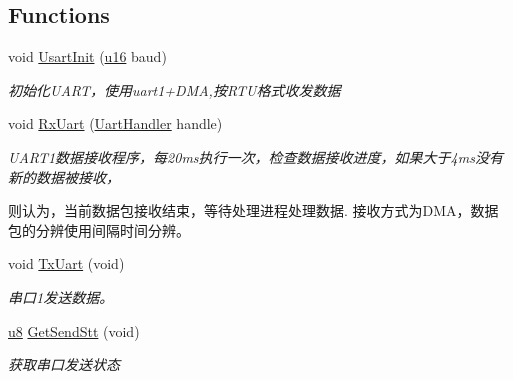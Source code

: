\subsection*{\-Functions}
\begin{DoxyCompactItemize}
\item 
void \hyperlink{group___u_a_r_t_gaa4ad4280e1468dfe3e2f3c30cfe1947a}{\-Usart\-Init} (\hyperlink{group___b_s_p_ga9e6c91d77e24643b888dbd1a1a590054}{u16} baud)
\begin{DoxyCompactList}\small\item\em 初始化\-U\-A\-R\-T，使用uart1+\-D\-M\-A,按\-R\-T\-U格式收发数据 \end{DoxyCompactList}\item 
void \hyperlink{group___u_a_r_t_ga25d30fac5e8dbe52d5ba2b28e76beb03}{\-Rx\-Uart} (\hyperlink{group___u_a_r_t_gacf0df3a8e9e8a2adfd954a81e7a894ec}{\-Uart\-Handler} handle)
\begin{DoxyCompactList}\small\item\em \-U\-A\-R\-T1数据接收程序，每20ms执行一次，检查数据接收进度，如果大于4ms没有新的数据被接收， \par
 则认为，当前数据包接收结束，等待处理进程处理数据. 接收方式为\-D\-M\-A，数据包的分辨使用间隔时间分辨。 \end{DoxyCompactList}\item 
void \hyperlink{group___u_a_r_t_ga34c7b2209242d4a50fddc81065cabba1}{\-Tx\-Uart} (void)
\begin{DoxyCompactList}\small\item\em 串口1发送数据。 \end{DoxyCompactList}\item 
\hyperlink{group___b_s_p_gaed742c436da53c1080638ce6ef7d13de}{u8} \hyperlink{group___u_a_r_t_ga2b08673358b93138c1ca1e5585c1260e}{\-Get\-Send\-Stt} (void)
\begin{DoxyCompactList}\small\item\em 获取串口发送状态 \end{DoxyCompactList}\end{DoxyCompactItemize}
